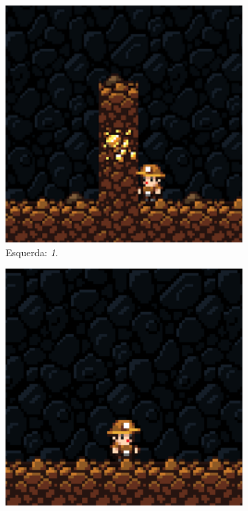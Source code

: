 \begin{figure}[H]
\centering
	\begin{subfigure}[b]{0.2\textwidth}
        \includegraphics[width=\textwidth]{fig/obstacle-2.pdf}
        \caption{Esquerda: \textit{1}.}
	\end{subfigure}
	\begin{subfigure}[b]{0.2\textwidth}
        \includegraphics[width=\textwidth]{fig/obstacle-3.pdf}

\end{subfigure}
\end{figure}
